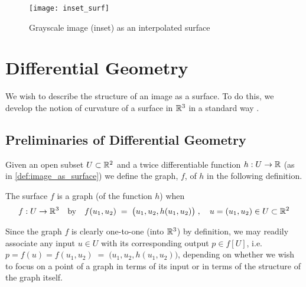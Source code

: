 \begin{figure}[t]
\texttt{[image: inset\_surf]}
\caption{Grayscale image (inset) as an interpolated surface}
\label{fig:inset_surf}
\end{figure}
 
\section{Differential Geometry} \label{sec:differential-geometry}
  
We wish to describe the structure of an image as a surface. To do this, we develop the notion of curvature of a surface in $\mathbb{R}^3$ in a standard way \autocite{Kuhnel-DiffGeo}.

\subsection{Preliminaries of Differential Geometry}
    Given an open subset $U\subset \mathbb{R}^2$ and a twice differentiable function  $h: U \to \mathbb{R}$ (as in \cref{def:image_as_surface})
    we define the graph, $f$, of $h$ in the following definition.
    
    \begin{defn} \label{def:graph}
    The surface $f$ is a graph (of the function $h$) when 
    \[
     f: U \to \mathbb{R}^3 \quad \textrm{by} \quad f(u_1, u_2) \;=\; \big(u_1 , u_2 , h(u_1,u_2)\big)
     \;,\quad u = (u_1, u_2) \in U \subset \mathbb{R}^2 \]
    \end{defn}
    Since the graph $f$ is clearly one-to-one (into $\mathbb{R}^3$) by definition, we may readily associate any input $u\in U$ with
    its corresponding output $p \in f[U]$, i.e.
    $ p = f(u) = f(u_1, u_2) \;=\; \big(u_1 , u_2 , h(u_1,u_2)\big)$,
    depending on whether we wish to focus on a point of a graph in terms of its input
    or in terms of the structure of the graph itself.
    
